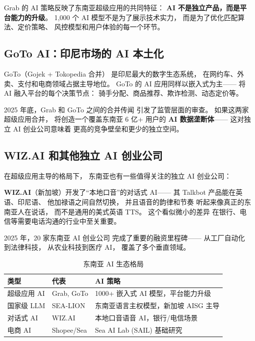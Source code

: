 Grab 的 AI 策略反映了东南亚超级应用的共同特征：
\textbf{AI 不是独立产品，而是平台能力的升级}。
1,000 个 AI 模型不是为了展示技术实力，
而是为了优化匹配算法、定价策略、
风控模型和用户体验的每一个环节。

\subsection{GoTo AI：印尼市场的 AI 本土化}

GoTo（Gojek + Tokopedia 合并）
是印尼最大的数字生态系统，
在网约车、外卖、支付和电商领域占据主导地位。
GoTo 的 AI 应用同样以嵌入式为主——
将 AI 融入平台的每个决策节点：
骑手分配、商品推荐、欺诈检测、动态定价等。

2025 年底，Grab 和 GoTo 之间的合并传闻
引发了监管层面的审查。
如果这两家超级应用合并，
将创造一个覆盖东南亚 6 亿+ 用户的
\textbf{AI 数据垄断体}——
这对独立 AI 创业公司意味着
更高的竞争壁垒和更少的独立空间。

\subsection{WIZ.AI 和其他独立 AI 创业公司}

在超级应用主导的格局下，
东南亚也有一些值得关注的独立 AI 创业公司：

\textbf{WIZ.AI}（新加坡）开发了``本地口音''的对话式 AI——
其 Talkbot 产品能在英语、印尼语、
他加禄语之间自然切换，
并且语音的韵律和节奏
听起来像真正的东南亚人在说话，
而不是通用的美式英语 TTS。
这个看似微小的差异
在银行、电信等需要电话沟通的行业中至关重要。

2025 年，20 家东南亚 AI 创业公司
完成了重要的融资里程碑——
从工厂自动化到法律科技，
从农业科技到医疗 AI，
覆盖了多个垂直领域。

\begin{table}[htbp]
\centering
\caption{东南亚 AI 生态格局}
\label{tab:sea-ai}
\small
\begin{tabularx}{\textwidth}{l l X}
\toprule
\rowcolor{figLightGray}
\textbf{类型} & \textbf{代表} & \textbf{AI 策略} \\
\midrule
超级应用 AI & Grab, GoTo   & 1000+ 嵌入式 AI 模型，平台能力升级 \\
国家级 LLM & SEA-LION      & 东南亚语言主权模型，新加坡 AISG 主导 \\
对话式 AI  & WIZ.AI        & 本地口音语音 AI，银行/电信场景 \\
电商 AI    & Shopee/Sea    & Sea AI Lab (SAIL) 基础研究 \\
\bottomrule
\end{tabularx}
\end{table}


